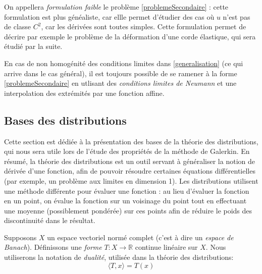 \documentclass[12pt]{article}
\newcommand{\R}{\mathbb R}
\begin{document}
On appellera \emph{formulation faible} le problème \eqref{problemeSecondaire} : cette formulation est plus généaliste, car ellle permet d'étudier des cas où $u$ n'est pas de classe $C^2$, car les dérivées sont toutes simples. Cette formulation permet de décrire par exemple le problème de la déformation d'une corde élastique, qui sera étudié par la suite.

En cas de non homogénité des conditions limites dans \eqref{generalisation} (ce qui arrive dans le cas général), il est toujours possible de se ramener à la forme \eqref{problemeSecondaire} en utlisant des \emph{conditions limites de Neumann} et une interpolation des extrémités par une fonction affine.

\subsection{Bases des distributions}

Cette section est dédiée à la présentation des bases de la théorie des distributions, qui nous sera utile lors de l'étude des propriétés de la méthode de Galerkin. En résumé, la théorie des distributions est un outil servant à généraliser la notion de dérivée d'une fonction, afin de pouvoir résoudre certaines équations différentielles (par exemple, un problème aux limites en dimension 1). Les distributions utilisent une méthode différente pour évaluer une fonction : au lieu d'évaluer la fonction en un point, on évalue la fonction sur un voisinage du point tout en effectuant une moyenne (possiblement pondérée) sur ces points afin de réduire le poids des discontinuité dans le résultat.

Supposons $X$ un espace vectoriel normé complet (c'est à dire un \emph{espace de Banach}). Définissons une \emph{forme} $T: X \rightarrow \R$ continue linéaire sur $X$. Nous utiliserons la notation de \emph{dualité}, utilisée dans la théorie des distributions:
\begin{equation}
\langle T, x\rangle = T(x)
\end{equation}
\end{document}
